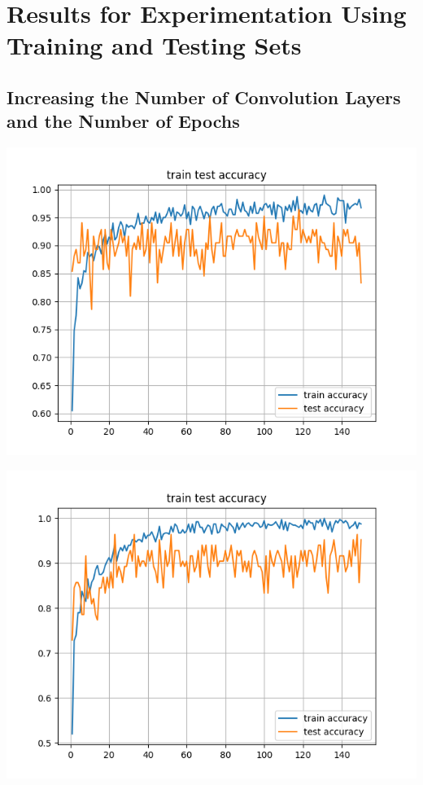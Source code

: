 \documentclass[12pt]{article}
\begin{document}
	\section{Results for Experimentation Using Training and Testing Sets}
		\subsection{Increasing the Number of Convolution Layers and the Number of Epochs}
		
			\includegraphics[width=\linewidth - 2cm]{accuracy_2_hidden_layers.png}
			
			\includegraphics[width=\linewidth - 2cm]{accuracy_4_hidden_layers.png}
			
\end{document}
